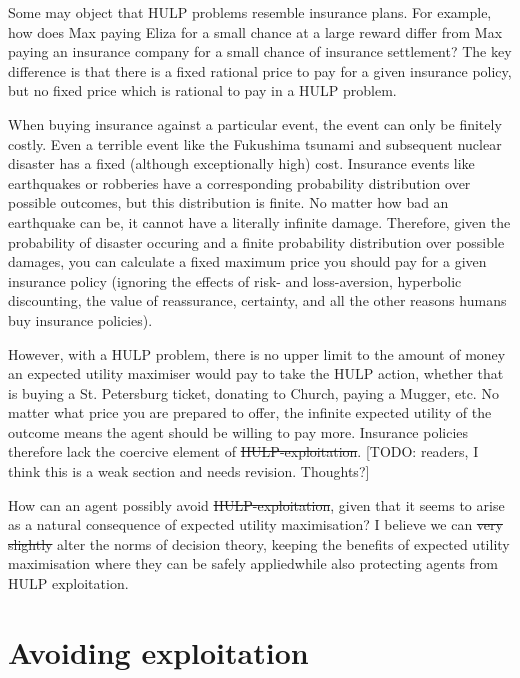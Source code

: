 \documentclass{article}
\providecommand{\DIFadd}[1]{{\protect\color{blue}\uwave{#1}}} %
\providecommand{\DIFdel}[1]{{\protect\color{red}\sout{#1}}}                      %
\providecommand{\DIFaddbegin}{} %
\providecommand{\DIFaddend}{} %
\providecommand{\DIFdelbegin}{} %
\providecommand{\DIFdelend}{} %
\begin{document}
Some may object that HULP problems resemble insurance plans. For example, how does Max paying Eliza for a small chance at a large reward differ from Max paying an insurance company for a small chance of insurance settlement? The key difference is that there is a fixed rational price to pay for a given insurance policy, but no fixed price which is rational to pay in a HULP problem.

When buying insurance against a particular event, the event can only be finitely costly. Even a terrible event like the Fukushima tsunami and subsequent nuclear disaster has a fixed (although exceptionally high) cost. Insurance events like earthquakes or robberies have a corresponding probability distribution over possible outcomes, but this distribution is finite. No matter how bad an earthquake can be, it cannot have a literally infinite damage. Therefore, given the probability of disaster occuring and a finite probability distribution over possible damages, you can calculate a fixed maximum price you should pay for a given insurance policy (ignoring the effects of risk- and loss-aversion, hyperbolic discounting, the value of reassurance, certainty, and all the other reasons humans buy insurance policies). 

However, with a HULP problem, there is no upper limit to the amount of money an expected utility maximiser would pay to take the HULP action, whether that is buying a St. Petersburg ticket, donating to Church, paying a Mugger, etc. No matter what price you are prepared to offer, the infinite expected utility of the outcome means the agent should be willing to pay more. Insurance policies therefore lack the coercive element of \DIFdelbegin \DIFdel{HULP-exploitation}\DIFdelend \DIFaddbegin \DIFadd{HULP exploitation}\DIFaddend . [TODO: readers, I think this is a weak section and needs revision. Thoughts?]

How can an agent possibly avoid \DIFdelbegin \DIFdel{HULP-exploitation}\DIFdelend \DIFaddbegin \DIFadd{HULP exploitation}\DIFaddend , given that it seems to arise as a natural consequence of expected utility maximisation? I believe we can \DIFdelbegin \DIFdel{very slightly }\DIFdelend alter the norms of decision theory, keeping the benefits of expected utility maximisation where they can be safely applied\DIFaddbegin \DIFadd{, }\DIFaddend while also protecting agents from HULP exploitation.

\section{Avoiding exploitation}
\end{document}
